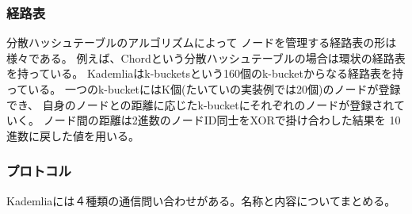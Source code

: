 \documentclass[sotsuron]{jcsie}
\begin{document}
\subsubsection{経路表}
分散ハッシュテーブルのアルゴリズムによって
ノードを管理する経路表の形は様々である。
例えば、Chordという分散ハッシュテーブルの場合は環状の経路表を持っている。
Kademliaはk-bucketsという160個のk-bucketからなる経路表を持っている。
一つのk-bucketにはK個(たいていの実装例では20個)のノードが登録でき、
自身のノードとの距離に応じたk-bucketにそれぞれのノードが登録されていく。
ノード間の距離は2進数のノードID同士をXORで掛け合わした結果を
10進数に戻した値を用いる。
\subsubsection{プロトコル}
Kademliaには４種類の通信問い合わせがある。名称と内容についてまとめる。
\end{document}
